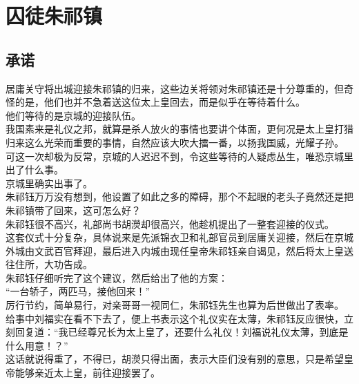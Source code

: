 \section{囚徒朱祁镇}
\ifnum{}
	\begin{multicols}{\theparacolNo}
\fi
\subsection{承诺}
居庸关守将出城迎接朱祁镇的归来，这些边关将领对朱祁镇还是十分尊重的，但奇怪的是，他们也并不急着送这位太上皇回去，而是似乎在等待着什么。\\

他们等待的是京城的迎接队伍。\\

我国素来是礼仪之邦，就算是杀人放火的事情也要讲个体面，更何况是太上皇打猎归来这么光荣而重要的事情，自然应该大吹大擂一番，以扬我国威，光耀子孙。\\

可这一次却极为反常，京城的人迟迟不到，令这些等待的人疑虑丛生，唯恐京城里出了什么事。\\

京城里确实出事了。\\

朱祁钰万万没有想到，他设置了如此之多的障碍，那个不起眼的老头子竟然还是把朱祁镇带了回来，这可怎么好？\\

朱祁钰很不高兴，礼部尚书胡濙却很高兴，他趁机提出了一整套迎接的仪式。\\

这套仪式十分复杂，具体说来是先派锦衣卫和礼部官员到居庸关迎接，然后在京城外城由文武百官拜迎，最后进入内城由现任皇帝朱祁钰亲自谒见，然后将太上皇送往住所，大功告成。\\

朱祁钰仔细听完了这个建议，然后给出了他的方案：\\

“一台轿子，两匹马，接他回来！”\\

厉行节约，简单易行，对亲哥哥一视同仁，朱祁钰先生也算为后世做出了表率。\\

给事中刘福实在看不下去了，便上书表示这个礼仪实在太薄，朱祁钰反应很快，立刻回复道：“我已经尊兄长为太上皇了，还要什么礼仪！刘福说礼仪太薄，到底是什么用意！？”\\

这话就说得重了，不得已，胡濙只得出面，表示大臣们没有别的意思，只是希望皇帝能够亲近太上皇，前往迎接罢了。\\


\end{multicols}
